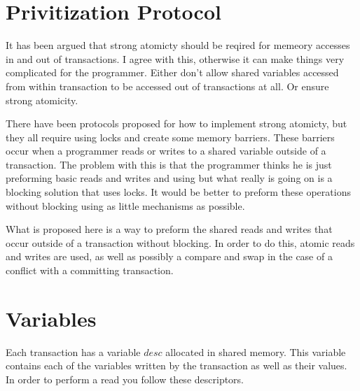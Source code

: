 \documentclass[11pt]{article}
\begin{document}
\newenvironment{theorem-repeat}[1]{\begin{trivlist}
\item[\hspace{\labelsep}{\bf\noindent Theorem~\ref{#1} }]}%
{\end{trivlist}}

\newenvironment{corollary-repeat}[1]{\begin{trivlist}
\item[\hspace{\labelsep}{\bf\noindent Corollary~\ref{#1} }]}%
{\end{trivlist}}


\newcommand{\Xomit}[1]{}




\section{Privitization Protocol}
It has been argued that strong atomicty should be reqired for memeory accesses in and out of transactions.
I agree with this, otherwise it can make things very complicated for the programmer.
Either don't allow shared variables accessed from within transaction to be accessed out of transactions at all.
Or ensure strong atomicity.

There have been protocols proposed for how to implement strong atomicty, but they all require using locks
and create some memory barriers.
These barriers occur when a programmer reads or writes to a shared variable outside of a transaction.
The problem with this is that the programmer thinks he is just preforming basic reads and writes and using
but what really is going on is a blocking solution that uses locks.
It would be better to preform these operations without blocking using as little mechanisms as possible.

What is proposed here is a way to preform the shared reads and writes that occur outside of a transaction
without blocking.
In order to do this, atomic reads and writes are used, as well as possibly a compare and swap in the case
of a conflict with a committing transaction.


\section{Variables}
Each transaction has a variable $desc$ allocated in shared memory.
This variable contains each of the variables written by the transaction as well as their values.
In order to perform a read you follow these descriptors.
\end{document}

